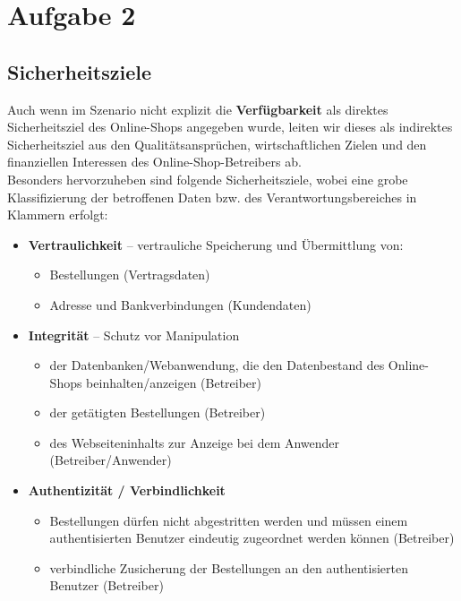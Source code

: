\chapter{Aufgabe 2}



\section{Sicherheitsziele}

Auch wenn im Szenario nicht explizit die \textbf{Verfügbarkeit} als direktes Sicherheitsziel des Online-Shops angegeben wurde, leiten wir dieses als indirektes Sicherheitsziel aus den Qualitätsansprüchen, wirtschaftlichen Zielen und den finanziellen Interessen des Online-Shop-Betreibers ab.\\
Besonders hervorzuheben sind folgende Sicherheitsziele, wobei eine grobe Klassifizierung der betroffenen Daten bzw. des Verantwortungsbereiches in Klammern erfolgt:

\begin{itemize}
    \itemsep0.5em
    \item \textbf{Vertraulichkeit} – vertrauliche Speicherung und Übermittlung von:
    \begin{itemize}
        \item Bestellungen (Vertragsdaten)
        \item Adresse und Bankverbindungen (Kundendaten)
    \end{itemize}
    \item \textbf{Integrität} – Schutz vor Manipulation
    \begin{itemize}
        \item der Datenbanken/Webanwendung, die den Datenbestand des Online-Shops beinhalten/anzeigen (Betreiber)
        \item der getätigten Bestellungen (Betreiber)
        \item des Webseiteninhalts zur Anzeige bei dem Anwender (Betreiber/Anwender)
    \end{itemize}
    \item \textbf{Authentizität / Verbindlichkeit}
    \begin{itemize}
        \item Bestellungen dürfen nicht abgestritten werden und müssen einem authentisierten Benutzer eindeutig zugeordnet werden können (Betreiber)
        \item verbindliche Zusicherung der Bestellungen an den authentisierten Benutzer (Betreiber)
    \end{itemize}
\end{itemize}

